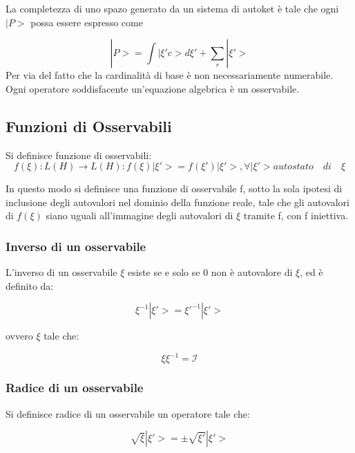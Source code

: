 \documentclass{article}
\begin{document}
La completezza di uno spazo generato da un sistema di autoket è tale che ogni $|P>$ possa essere espresso come

\begin{equation}
    |P>= \int{|\xi'c>d\xi'}+ \sum_{r}|\xi'>
\end{equation}
Per via del fatto che la cardinalità di base è non necessariamente numerabile.
Ogni operatore soddisfacente un'equazione algebrica è un osservabile.

\subsection{Funzioni di Osservabili}

Si definisce funzione di osservabili:
\begin{equation}
    f(\xi): L(H) \rightarrow L(H) : f(\xi)|\xi'>= f(\xi')|\xi'>, \forall |\xi'> autostato \quad di \quad  \xi
\end{equation}

In questo modo si definisce una funzione di osservabile f, sotto la sola ipotesi di inclusione degli autovalori nel dominio della
funzione reale, tale che gli autovalori di $f(\xi)$ siano uguali all'immagine degli autovalori di $\xi$ tramite f, con f iniettiva.

\subsubsection{Inverso di un osservabile}
L'inverso di un osservabile $\xi$ esiste se e solo se 0 non è autovalore di $\xi$, ed è definito da:

\begin{equation}
    \xi^{-1} |\xi'>= \xi'^{-1}|\xi'>
\end{equation}

ovvero $\xi$ tale che:

\begin{equation}
    \xi\xi^{-1}=\mathcal{I}
\end{equation}

\subsubsection{Radice di un osservabile}

Si definisce radice di un osservabile un operatore tale che:

\begin{equation}
    \sqrt{\xi} |\xi'>= \pm \sqrt{\xi'} |\xi'>
\end{equation}
\end{document}
